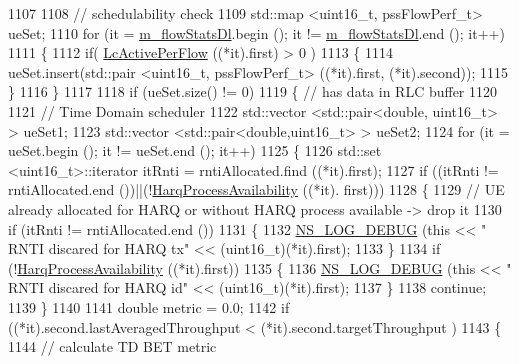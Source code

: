 \begin{DoxyCode}
1107 
1108   \textcolor{comment}{// schedulability check}
1109   std::map <uint16\_t, pssFlowPerf\_t> ueSet;
1110   \textcolor{keywordflow}{for} (it = \hyperlink{classns3_1_1PssFfMacScheduler_add144474dc7bd9d89b93ff14bc8d27c9}{m\_flowStatsDl}.begin (); it != \hyperlink{classns3_1_1PssFfMacScheduler_add144474dc7bd9d89b93ff14bc8d27c9}{m\_flowStatsDl}.end (); it++)
1111     \{
1112       \textcolor{keywordflow}{if}( \hyperlink{classns3_1_1PssFfMacScheduler_afa94be0f9d6a6f6ce3aee86abf764e27}{LcActivePerFlow} ((*it).first) > 0 )
1113         \{
1114           ueSet.insert(std::pair <uint16\_t, pssFlowPerf\_t> ((*it).first, (*it).second));
1115         \}
1116     \}
1117 
1118   \textcolor{keywordflow}{if} (ueSet.size() != 0)
1119     \{ \textcolor{comment}{// has data in RLC buffer}
1120 
1121       \textcolor{comment}{// Time Domain scheduler}
1122       std::vector <std::pair<double, uint16\_t> > ueSet1;
1123       std::vector <std::pair<double,uint16\_t> > ueSet2;
1124       \textcolor{keywordflow}{for} (it = ueSet.begin (); it != ueSet.end (); it++)
1125         \{
1126           std::set <uint16\_t>::iterator itRnti = rntiAllocated.find ((*it).first);
1127           \textcolor{keywordflow}{if} ((itRnti != rntiAllocated.end ())||(!\hyperlink{classns3_1_1PssFfMacScheduler_a1740bdf713ce5efee7e691ea11176d4c}{HarqProcessAvailability} ((*it).
      first)))
1128             \{
1129               \textcolor{comment}{// UE already allocated for HARQ or without HARQ process available -> drop it}
1130               \textcolor{keywordflow}{if} (itRnti != rntiAllocated.end ())
1131               \{
1132                 \hyperlink{group__logging_ga413f1886406d49f59a6a0a89b77b4d0a}{NS\_LOG\_DEBUG} (\textcolor{keyword}{this} << \textcolor{stringliteral}{" RNTI discared for HARQ tx"} << (uint16\_t)(*it).first);
1133               \}
1134               \textcolor{keywordflow}{if} (!\hyperlink{classns3_1_1PssFfMacScheduler_a1740bdf713ce5efee7e691ea11176d4c}{HarqProcessAvailability} ((*it).first))
1135               \{
1136                 \hyperlink{group__logging_ga413f1886406d49f59a6a0a89b77b4d0a}{NS\_LOG\_DEBUG} (\textcolor{keyword}{this} << \textcolor{stringliteral}{" RNTI discared for HARQ id"} << (uint16\_t)(*it).first);
1137               \}
1138               \textcolor{keywordflow}{continue};
1139             \}
1140     
1141           \textcolor{keywordtype}{double} metric = 0.0;
1142           \textcolor{keywordflow}{if} ((*it).second.lastAveragedThroughput < (*it).second.targetThroughput )
1143             \{
1144                     \textcolor{comment}{// calculate TD BET metric}

\end{DoxyCode}
